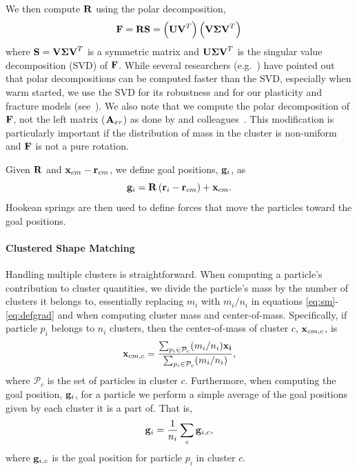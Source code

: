 \documentclass[review]{acmsiggraph}
\begin{document}
We then compute $\mathit{\mathbf{R}}$ using the polar decomposition,
\begin{equation}
\label{eq:decomp}
\mathit{\mathbf{F}} = \mathit{\mathbf{R}}\mathit{\mathbf{S}} = \left(\mathit{\mathbf{UV}}^T\right)\left(\mathit{\mathbf{V\Sigma V}}^T\right)
\end{equation}
where $\mathit{\mathbf{S}}=\mathit{\mathbf{V\Sigma V}}^T$ is a symmetric matrix and $\mathit{\mathbf{U\Sigma V}}^T$ is the singular value decomposition (SVD) of $\mathit{\mathbf{F}}$.
While several researchers (e.g.~\cite{Rivers:2007:FFL}) have pointed out that polar decompositions can be computed faster than the SVD,
especially when warm started, we use the SVD for its robustness and for our plasticity and fracture models 
(see~).  
We also note that we compute the polar decomposition of $\mathit{\mathbf{F}}$, not
the left matrix ($\mathit{\mathbf{A}}_{xr}$)
as done by \Mueller and colleagues~.  This modification
is particularly important if the distribution of mass in the cluster is non-uniform and $\mathit{\mathbf{F}}$ is not a pure rotation.

Given $\mathit{\mathbf{R}}$ and $\mathit{\mathbf{x}}_{cm}-\mathit{\mathbf{r}}_{cm}$, we define goal positions, $\mathit{\mathbf{g}}_i$, as
\begin{equation}
\mathit{\mathbf{g}}_i = \mathit{\mathbf{R}}\left(\mathit{\mathbf{r}}_i-\mathit{\mathbf{r}}_{cm}\right)+\mathit{\mathbf{x}}_{cm}.
\end{equation}
Hookean springs are then used to define forces that move the particles toward the goal positions.

\paragraph{Clustered Shape Matching}
Handling multiple clusters is straightforward.  When computing a particle's contribution to 
cluster quantities, we divide the particle's mass by the number of clusters it belongs to,
essentially replacing $m_i$ with $m_i/n_i$ in equations \eqref{eq:sm}-\eqref{eq:defgrad} 
and when computing cluster mass and center-of-mass.
Specifically, if particle $p_i$ belongs
to $n_i$ clusters, then the center-of-mass of cluster $c$, $\mathit{\mathbf{x}}_{cm,c}$, is
\begin{equation}
\mathit{\mathbf{x}}_{cm,c} = \frac{\sum_{p_i\in\mathcal{P}_c}(m_i/n_i)\mathit{\mathbf{x_i}}}{\sum_{p_i\in\mathcal{P}_c}(m_i/n_i)},
\end{equation}
where $\mathcal{P}_c$ is the set of particles in cluster $c$.
Furthermore, when computing the goal position, $\mathit{\mathbf{g}}_i$, for a particle we perform a simple
average of the goal positions given by each cluster it is a part of.  That is,
\begin{equation}
\mathit{\mathbf{g}}_i = \frac{1}{n_i} \sum_c \mathit{\mathbf{g}}_{i,c},
\end{equation}
where $\mathit{\mathbf{g}}_{i,c}$ is the goal position for particle $p_i$ in cluster $c$.
\end{document}
